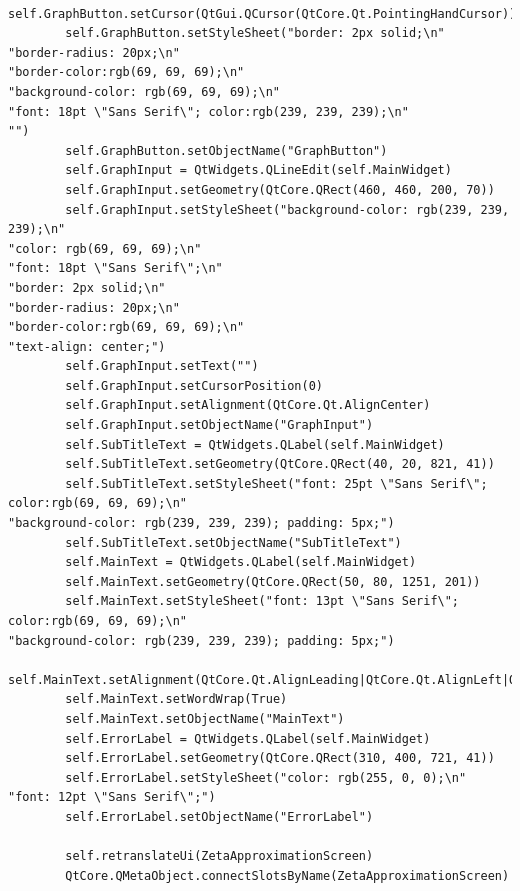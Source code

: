 \documentclass[12pt]{article}
\begin{document}
\begin{lstlisting}
        self.GraphButton.setCursor(QtGui.QCursor(QtCore.Qt.PointingHandCursor))
        self.GraphButton.setStyleSheet("border: 2px solid;\n"
"border-radius: 20px;\n"
"border-color:rgb(69, 69, 69);\n"
"background-color: rgb(69, 69, 69);\n"
"font: 18pt \"Sans Serif\"; color:rgb(239, 239, 239);\n"
"")
        self.GraphButton.setObjectName("GraphButton")
        self.GraphInput = QtWidgets.QLineEdit(self.MainWidget)
        self.GraphInput.setGeometry(QtCore.QRect(460, 460, 200, 70))
        self.GraphInput.setStyleSheet("background-color: rgb(239, 239, 239);\n"
"color: rgb(69, 69, 69);\n"
"font: 18pt \"Sans Serif\";\n"
"border: 2px solid;\n"
"border-radius: 20px;\n"
"border-color:rgb(69, 69, 69);\n"
"text-align: center;")
        self.GraphInput.setText("")
        self.GraphInput.setCursorPosition(0)
        self.GraphInput.setAlignment(QtCore.Qt.AlignCenter)
        self.GraphInput.setObjectName("GraphInput")
        self.SubTitleText = QtWidgets.QLabel(self.MainWidget)
        self.SubTitleText.setGeometry(QtCore.QRect(40, 20, 821, 41))
        self.SubTitleText.setStyleSheet("font: 25pt \"Sans Serif\"; color:rgb(69, 69, 69);\n"
"background-color: rgb(239, 239, 239); padding: 5px;")
        self.SubTitleText.setObjectName("SubTitleText")
        self.MainText = QtWidgets.QLabel(self.MainWidget)
        self.MainText.setGeometry(QtCore.QRect(50, 80, 1251, 201))
        self.MainText.setStyleSheet("font: 13pt \"Sans Serif\"; color:rgb(69, 69, 69);\n"
"background-color: rgb(239, 239, 239); padding: 5px;")
        self.MainText.setAlignment(QtCore.Qt.AlignLeading|QtCore.Qt.AlignLeft|QtCore.Qt.AlignTop)
        self.MainText.setWordWrap(True)
        self.MainText.setObjectName("MainText")
        self.ErrorLabel = QtWidgets.QLabel(self.MainWidget)
        self.ErrorLabel.setGeometry(QtCore.QRect(310, 400, 721, 41))
        self.ErrorLabel.setStyleSheet("color: rgb(255, 0, 0);\n"
"font: 12pt \"Sans Serif\";")
        self.ErrorLabel.setObjectName("ErrorLabel")

        self.retranslateUi(ZetaApproximationScreen)
        QtCore.QMetaObject.connectSlotsByName(ZetaApproximationScreen)


\end{lstlisting}
\end{document}
